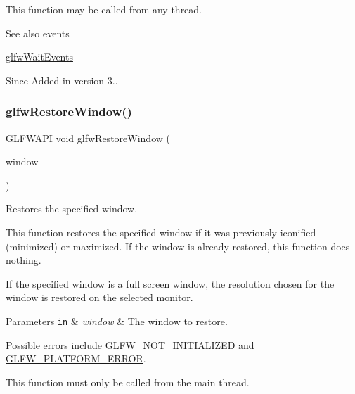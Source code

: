 This function may be called from any thread.

\begin{DoxySeeAlso}{See also}
events 

\hyperlink{group__window_ga6e042d05823c11e11c7339b81a237738}{glfw\+Wait\+Events}
\end{DoxySeeAlso}
\begin{DoxySince}{Since}
Added in version 3.. 
\end{DoxySince}
\mbox{\label{group__window_ga1e29caf0b819f578b04db52fff17256c}} 
\subsubsection{\texorpdfstring{glfw\+Restore\+Window()}{glfwRestoreWindow()}}
{\footnotesize\ttfamily G\+L\+F\+W\+A\+PI void glfw\+Restore\+Window (\begin{DoxyParamCaption}\item[{\hyperlink{group__window_ga3c96d80d363e67d13a41b5d1821f3242}{G\+L\+F\+Wwindow} $\ast$}]{window }\end{DoxyParamCaption})}



Restores the specified window. 

This function restores the specified window if it was previously iconified (minimized) or maximized. If the window is already restored, this function does nothing.

If the specified window is a full screen window, the resolution chosen for the window is restored on the selected monitor.


\begin{DoxyParams}[1]{Parameters}
\mbox{\tt in}  & {\em window} & The window to restore.\\
\hline
\end{DoxyParams}
Possible errors include \hyperlink{group__errors_ga2374ee02c177f12e1fa76ff3ed15e14a}{G\+L\+F\+W\+\_\+\+N\+O\+T\+\_\+\+I\+N\+I\+T\+I\+A\+L\+I\+Z\+ED} and \hyperlink{group__errors_gad44162d78100ea5e87cdd38426b8c7a1}{G\+L\+F\+W\+\_\+\+P\+L\+A\+T\+F\+O\+R\+M\+\_\+\+E\+R\+R\+OR}.

This function must only be called from the main thread.

